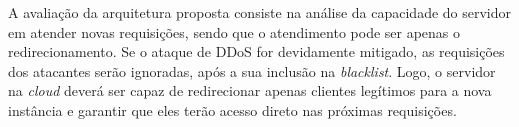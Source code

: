 

% 

A avaliação da arquitetura proposta consiste na análise
da capacidade do servidor em atender novas requisições, sendo que o atendimento pode ser apenas o redirecionamento. 
Se o ataque de DDoS for devidamente
mitigado, as requisições dos atacantes serão ignoradas, após a sua inclusão na \emph{blacklist}. Logo, o servidor na \emph{cloud} deverá ser capaz de redirecionar apenas clientes legítimos 
para a nova instância e garantir que eles terão acesso direto nas próximas requisições. 
%
%



